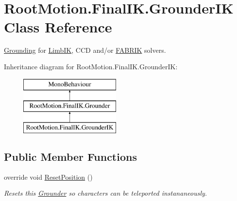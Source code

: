 \hypertarget{class_root_motion_1_1_final_i_k_1_1_grounder_i_k}{}\section{Root\+Motion.\+Final\+I\+K.\+Grounder\+IK Class Reference}
\label{class_root_motion_1_1_final_i_k_1_1_grounder_i_k}


\mbox{\hyperlink{class_root_motion_1_1_final_i_k_1_1_grounding}{Grounding}} for \mbox{\hyperlink{class_root_motion_1_1_final_i_k_1_1_limb_i_k}{Limb\+IK}}, C\+CD and/or \mbox{\hyperlink{class_root_motion_1_1_final_i_k_1_1_f_a_b_r_i_k}{F\+A\+B\+R\+IK}} solvers.  


Inheritance diagram for Root\+Motion.\+Final\+I\+K.\+Grounder\+IK\+:\begin{figure}[H]
\begin{center}
\leavevmode
\includegraphics[height=3.000000cm]{class_root_motion_1_1_final_i_k_1_1_grounder_i_k}
\end{center}
\end{figure}
\subsection*{Public Member Functions}
\begin{DoxyCompactItemize}
\item 
override void \mbox{\hyperlink{class_root_motion_1_1_final_i_k_1_1_grounder_i_k_a4a19512898c60ecd027f535198281b8f}{Reset\+Position}} ()
\begin{DoxyCompactList}\small\item\em Resets this \mbox{\hyperlink{class_root_motion_1_1_final_i_k_1_1_grounder}{Grounder}} so characters can be teleported instananeously. \end{DoxyCompactList}\end{DoxyCompactItemize}
